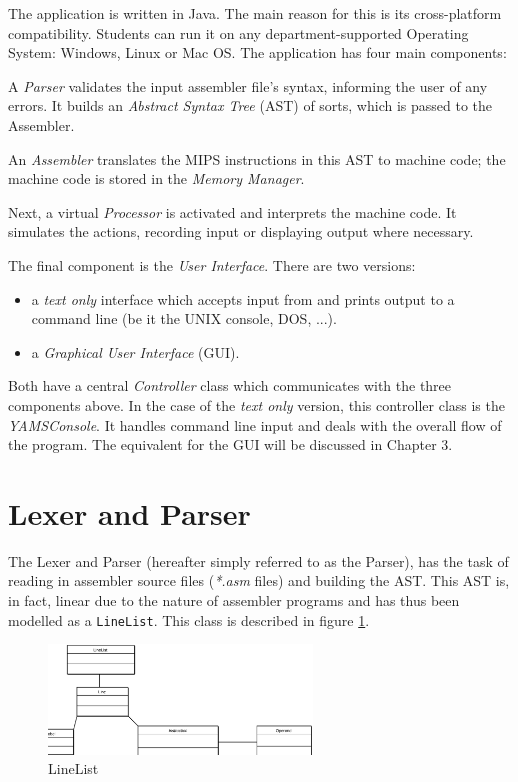 The application is written in Java. The main reason for this is its cross-platform compatibility. Students can run it on any department-supported Operating System: Windows, Linux or Mac OS. The application has four main components:

A \emph{Parser} validates the input assembler file's syntax, informing the user of any errors. It builds an \emph{Abstract Syntax Tree} (AST) of sorts, which is passed to the Assembler.

An \emph{Assembler} translates the MIPS instructions in this AST to machine code; the machine code is stored in the \emph{Memory Manager}.

Next, a virtual \emph{Processor} is activated and interprets the machine code. It simulates the actions, recording input or displaying output where necessary.

The final component is the \emph{User Interface}. There are two versions:
\begin{itemize}
\item a \emph{text only} interface which accepts input from and prints output to a command line (be it the UNIX console, DOS, ...).
\item a \emph{Graphical User Interface} (GUI).
\end{itemize}

Both have a central \emph{Controller} class which communicates with the three components above. In the case of the \emph{text only} version, this controller class is the \emph{YAMSConsole}. It handles command line input and deals with the overall flow of the program. The equivalent for the GUI will be discussed in Chapter 3.

\section{Lexer and Parser}

The Lexer and Parser (hereafter simply referred to as the Parser), has the task of reading in assembler source files (\emph{*.asm} files) and building the AST. This AST is, in fact, linear due to the nature of assembler programs and has thus been modelled as a {\tt LineList}. This class is described in figure \ref{figLineList}.

\begin{figure}[htbp]
\begin{center}
\includegraphics[width=7cm]{linelist.eps}
\end{center}
\caption{LineList}
\label{figLineList}
\end{figure}

